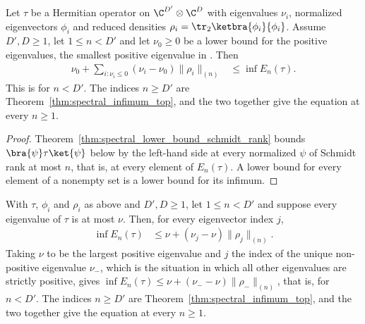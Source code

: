 \begin{theorem}
    \label{thm:spectral_infimum_lower_bound}
    \leanok
    Let $\tau$ be a Hermitian operator on $\C^{D'}\otimes\C^{D}$ with
    eigenvalues $\nu_i$, normalized eigenvectors $\phi_i$ and reduced densities
    $\rho_i=\tr_2\ketbra{\phi_i}{\phi_i}$. Assume $D',D\ge1$, let $1\le n<D'$
    and let $\nu_0\ge0$ be a lower bound for the positive eigenvalues, the smallest
    positive eigenvalue in \cite[Chapter~3]{Wolf2012Quantum}. Then
    \begin{align}
        \nu_0+\sum_{i:\nu_i\le0}(\nu_i-\nu_0)\|\rho_i\|_{(n)}
         & \le\inf E_n(\tau).
        \label{eq:channel_spectral_infimum_lower}
    \end{align}
    This is \cite[Chapter~3, equation~(3.7)]{Wolf2012Quantum} for $n<D'$. The
    indices $n\ge D'$ are Theorem~\ref{thm:spectral_infimum_top}, and the two
    together give the equation at every $n\ge1$.
\end{theorem}

\begin{proof}
    \leanok
    Theorem~\ref{thm:spectral_lower_bound_schmidt_rank} bounds
    $\bra{\psi}\tau\ket{\psi}$ below by the left-hand side at every normalized
    $\psi$ of Schmidt rank at most $n$, that is, at every element of
    $E_n(\tau)$. A lower bound for every element of a nonempty set is a lower
    bound for its infimum.
\end{proof}

\begin{theorem}
    \label{thm:spectral_infimum_upper_bound}
    \leanok
    With $\tau$, $\phi_i$ and $\rho_i$ as above and $D',D\ge1$, let
    $1\le n<D'$ and suppose every eigenvalue of $\tau$ is at most $\nu$. Then,
    for every eigenvector index $j$,
    \begin{align}
        \inf E_n(\tau)
         & \le\nu+(\nu_j-\nu)\|\rho_j\|_{(n)}.
        \label{eq:channel_spectral_infimum_upper}
    \end{align}
    Taking $\nu$ to be the largest positive eigenvalue and $j$ the index of the
    unique non-positive eigenvalue $\nu_-$, which is the situation in which all
    other eigenvalues are strictly positive, gives
    $\inf E_n(\tau)\le\nu+(\nu_--\nu)\|\rho_-\|_{(n)}$, that is,
    \cite[Chapter~3, equation~(3.8)]{Wolf2012Quantum} for $n<D'$. The indices
    $n\ge D'$ are Theorem~\ref{thm:spectral_infimum_top}, and the two together
    give the equation at every $n\ge1$.
\end{theorem}

